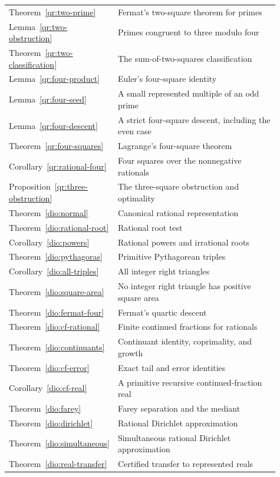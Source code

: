 \begin{longtable}{p{0.16\linewidth}p{0.75\linewidth}}
Theorem~\ref{qr:two-prime} & Fermat's two-square theorem for primes\\
Lemma~\ref{qr:two-obstruction} & Primes congruent to three modulo four\\
Theorem~\ref{qr:two-classification} & The sum-of-two-squares classification\\
Lemma~\ref{qr:four-product} & Euler's four-square identity\\
Lemma~\ref{qr:four-seed} & A small represented multiple of an odd prime\\
Lemma~\ref{qr:four-descent} & A strict four-square descent, including the even case\\
Theorem~\ref{qr:four-squares} & Lagrange's four-square theorem\\
Corollary~\ref{qr:rational-four} & Four squares over the nonnegative rationals\\
Proposition~\ref{qr:three-obstruction} & The three-square obstruction and optimality\\
Theorem~\ref{dio:normal} & Canonical rational representation\\
Theorem~\ref{dio:rational-root} & Rational root test\\
Corollary~\ref{dio:powers} & Rational powers and irrational roots\\
Theorem~\ref{dio:pythagoras} & Primitive Pythagorean triples\\
Corollary~\ref{dio:all-triples} & All integer right triangles\\
Theorem~\ref{dio:square-area} & No integer right triangle has positive square area\\
Theorem~\ref{dio:fermat-four} & Fermat's quartic descent\\
Theorem~\ref{dio:cf-rational} & Finite continued fractions for rationals\\
Theorem~\ref{dio:continuants} & Continuant identity, coprimality, and growth\\
Theorem~\ref{dio:cf-error} & Exact tail and error identities\\
Corollary~\ref{dio:cf-real} & A primitive recursive continued-fraction real\\
Theorem~\ref{dio:farey} & Farey separation and the mediant\\
Theorem~\ref{dio:dirichlet} & Rational Dirichlet approximation\\
Theorem~\ref{dio:simultaneous} & Simultaneous rational Dirichlet approximation\\
Theorem~\ref{dio:real-transfer} & Certified transfer to represented reals\\

\end{longtable}
